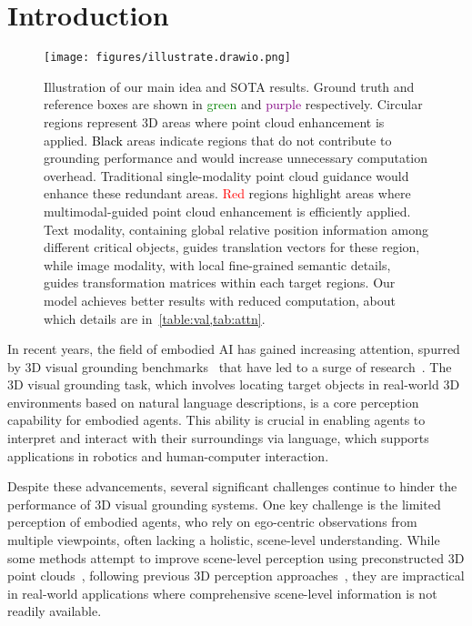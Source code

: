 \section{Introduction}
\label{sec:intro}


\begin{figure*}[t]
    \centering
    \texttt{[image: figures/illustrate.drawio.png]}
    \caption{Illustration of our main idea and SOTA results. Ground truth and reference boxes are shown in \textcolor{green}{green} and \textcolor{purple}{purple} respectively. Circular regions represent 3D areas where point cloud enhancement is applied. \textcolor{black}{Black} areas indicate regions that do not contribute to grounding performance and would increase unnecessary computation overhead. Traditional single-modality point cloud guidance would enhance these redundant areas. \textcolor{red}{Red} regions highlight areas where multimodal-guided point cloud enhancement is efficiently applied. Text modality, containing global relative position information among different critical objects, guides translation vectors for these region, while image modality, with local fine-grained semantic details, guides transformation matrices within each target regions. Our model achieves better results with reduced computation, about which details are in~\cref{table:val,tab:attn}.}
    \label{fig:illu}
\end{figure*}


In recent years, the field of embodied AI has gained increasing attention, spurred by 3D visual grounding benchmarks~\citep{achlioptas2020referit3d, chen2020scanrefer, wang2023embodiedscan} that have led to a surge of research~\citep{guo2023viewrefer, wu2023eda, zhao20213dvg, jain2022bottom, yang2024exploiting, huang2022multi, wang2023embodiedscan}. The 3D visual grounding task, which involves locating target objects in real-world 3D environments based on natural language descriptions, is a core perception capability for embodied agents. This ability is crucial in enabling agents to interpret and interact with their surroundings via language, which supports applications in robotics and human-computer interaction.

Despite these advancements, several significant challenges continue to hinder the performance of 3D visual grounding systems. One key challenge is the limited perception of embodied agents, who rely on ego-centric observations from multiple viewpoints, often lacking a holistic, scene-level understanding. While some methods attempt to improve scene-level perception using preconstructed 3D point clouds~\citep{wu2023eda, zhao20213dvg, jain2022bottom, yang2024exploiting, guo2023viewrefer, huang2022multi}, following previous 3D perception approaches~\citep{wu2024pointv3, jiang2020pointgroup}, they are impractical in real-world applications where comprehensive scene-level information is not readily available.


